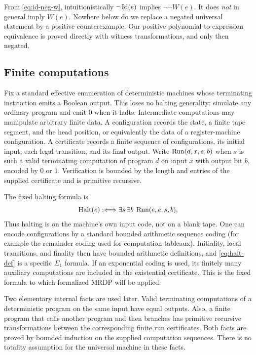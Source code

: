 \begin{remark}
From \eqref{eq:id-neg-w}, intuitionistically $\neg\operatorname{Id}(e)$ implies
$\neg\neg W(e)$. It does \emph{not} in general imply $W(e)$.
Nowhere below do we replace a negated universal statement by a positive
counterexample. Our positive polynomial-to-expression equivalence is
proved directly with witness transformations, and only then negated.
\end{remark}

\subsection{Finite computations}

Fix a standard effective enumeration of deterministic machines whose
terminating instruction emits a Boolean output. This loses no halting
generality: simulate any ordinary program and emit $0$ when it halts.
Intermediate computations may manipulate arbitrary finite data. A
configuration records the state, a finite tape segment, and the head
position, or equivalently the data of a register-machine configuration.
A certificate records a finite sequence of configurations, its initial
input, each legal transition, and its final output. Write
$\operatorname{Run}(d,x,s,b)$ when $s$ is such a valid terminating computation of program
$d$ on input $x$ with output bit $b$, encoded by $0$ or $1$.
Verification is bounded by the length
and entries of the supplied certificate and is primitive recursive.

The fixed halting formula is
\begin{equation}\label{eq:halt-def}
 \operatorname{Halt}(e):\Longleftrightarrow
 \exists s\,\exists b\;\operatorname{Run}(e,e,s,b).
\end{equation}
Thus halting is on the machine's own input code, not on a blank tape.
One can encode configurations by a standard bounded arithmetic sequence
coding (for example the remainder coding used for computation tableaux).
Initiality, local transitions, and finality then have bounded arithmetic
definitions, and \eqref{eq:halt-def} is a specific $\Sigma_1$ formula.
If an exponential coding is used, its finitely many auxiliary computations
are included in the existential certificate. This is the fixed formula to
which formalized MRDP will be applied.

Two elementary internal facts are used later. Valid terminating
computations of a deterministic program on the same input have equal
outputs. Also, a finite program that calls another program and then
branches has primitive recursive transformations between the corresponding
finite run certificates. Both facts are proved by bounded induction on
the supplied computation sequences. There is no totality assumption for
the universal machine in these facts.
